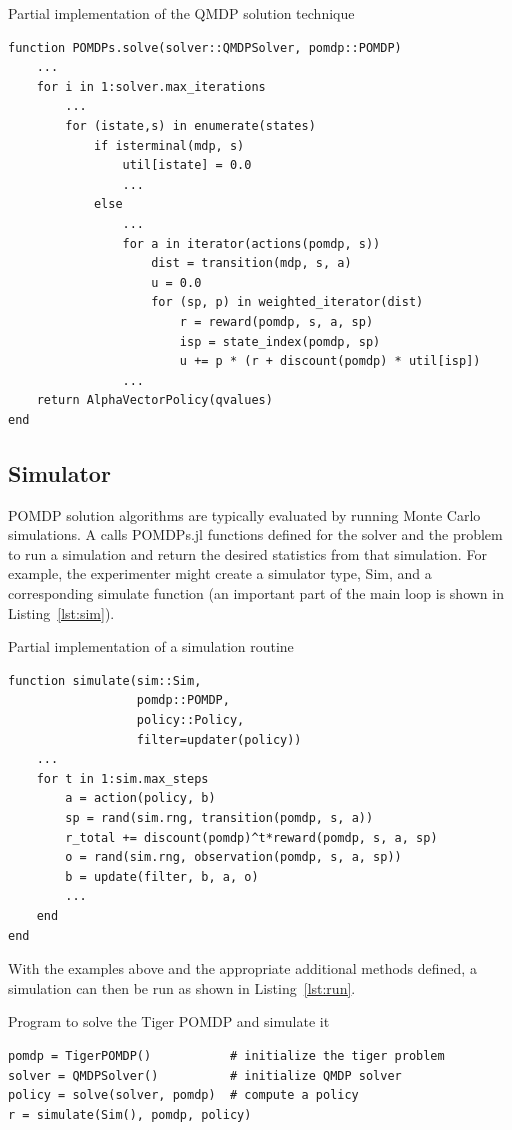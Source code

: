 \begin{lstfloat}
    \caption{Partial implementation of the QMDP solution technique} \label{lst:qmdp}    
\begin{lstlisting}
function POMDPs.solve(solver::QMDPSolver, pomdp::POMDP)
    ...
    for i in 1:solver.max_iterations
        ...
        for (istate,s) in enumerate(states)
            if isterminal(mdp, s)
                util[istate] = 0.0
                ...
            else
                ...
                for a in iterator(actions(pomdp, s))
                    dist = transition(mdp, s, a)
                    u = 0.0
                    for (sp, p) in weighted_iterator(dist)
                        r = reward(pomdp, s, a, sp)
                        isp = state_index(pomdp, sp)
                        u += p * (r + discount(pomdp) * util[isp])
                ...
    return AlphaVectorPolicy(qvalues)
end
\end{lstlisting}
\end{lstfloat}

\subsection{Simulator}

POMDP solution algorithms are typically evaluated by running Monte Carlo simulations.
A  calls POMDPs.jl functions defined for the solver and the problem to run a simulation and return the desired statistics from that simulation.
For example, the experimenter might create a simulator type, {\ttfamily Sim}, and a corresponding {\ttfamily simulate} function (an important part of the main loop is shown in Listing~\ref{lst:sim}).

\begin{lstfloat}
    \caption{Partial implementation of a simulation routine} \label{lst:sim}   
\begin{lstlisting}
function simulate(sim::Sim,
                  pomdp::POMDP,
                  policy::Policy,
                  filter=updater(policy))
    ...
    for t in 1:sim.max_steps
        a = action(policy, b)
        sp = rand(sim.rng, transition(pomdp, s, a))
        r_total += discount(pomdp)^t*reward(pomdp, s, a, sp)
        o = rand(sim.rng, observation(pomdp, s, a, sp))
        b = update(filter, b, a, o)
        ...
    end
end
\end{lstlisting}
\end{lstfloat}

With the examples above and the appropriate additional methods defined, a simulation can then be run as shown in Listing~\ref{lst:run}. 
\begin{lstfloat}
    \caption{Program to solve the Tiger POMDP and simulate it} \label{lst:run}
\begin{lstlisting}
pomdp = TigerPOMDP()           # initialize the tiger problem
solver = QMDPSolver()          # initialize QMDP solver
policy = solve(solver, pomdp)  # compute a policy
r = simulate(Sim(), pomdp, policy)
\end{lstlisting}
\end{lstfloat}

